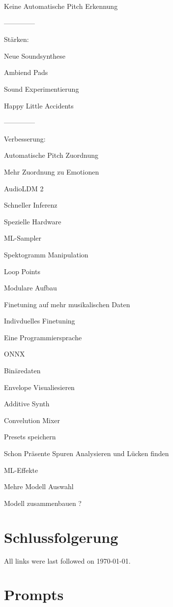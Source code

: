 \documentclass[
  a4paper,  %
  twoside,  %
  bibliography=totoc,
  headsepline,
  cleardoublepage=empty,
  parskip=half,
  draft=false
]{scrbook}
\begin{document}
Keine Automatische Pitch Erkennung

--------------

Stärken:

Neue Soundsynthese

Ambiend Pads

Sound Experimentierung

Happy Little Accidents


--------------

Verbesserung:

Automatische Pitch Zuordnung

Mehr Zuordnung zu Emotionen 

AudioLDM 2

Schneller Inferenz

Spezielle Hardware 

ML-Sampler

Spektogramm Manipulation 

Loop Points

Modulare Aufbau 

Finetuning auf mehr musikalischen Daten

Indivduelles Finetuning 

Eine Programmiersprache

ONNX

Binäredaten

Envelope Visualiesieren

Additive Synth

Convelution Mixer

Presets speichern 

Schon Präsente Spuren Analysieren und Lücken finden 

ML-Effekte

Mehre Modell Auswahl 

Modell zusammenbauen ? 





\chapter{Schlussfolgerung}
\label{sec:conclusion}


\printbibliography

All links were last followed on \today{}.

\appendix

\chapter{Prompts}
\label{chap:prompts}
\end{document}
